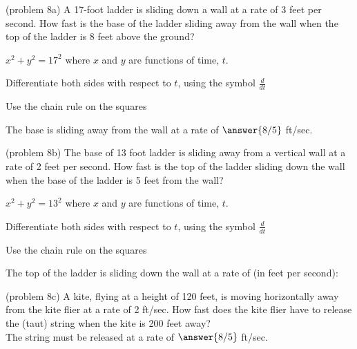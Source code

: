\documentclass[handout]{ximera}
\begin{document}
\begin{problem}(problem 8a)
A 17-foot ladder is sliding down a wall at a rate of 3 feet per second.  How fast is the base of the 
ladder sliding away from the wall when the top of the ladder is 8 feet above the ground?\\

\begin{hint}
$x^2 + y^2 = 17^2$ where  $x$ and $y$ are functions of time, $t$.
\end{hint}

\begin{hint}
Differentiate both sides with respect to $t$, using the symbol $\frac{d}{dt}$
\end{hint}
\begin{hint}
Use the chain rule on the squares
\end{hint}

The base is sliding away from the wall at a rate of $\answer{8/5}$ ft/sec.
\end{problem}

\begin{problem}(problem 8b)
The base of 13 foot ladder is sliding away from a vertical wall at a rate of 2 
feet per second.  How fast is the top of the ladder sliding down the wall when the base of the 
ladder is 5 feet from the wall?
\begin{hint}
$x^2 + y^2 = 13^2$ where  $x$ and $y$ are functions of time, $t$.
\end{hint}

\begin{hint}
Differentiate both sides with respect to $t$, using the symbol $\frac{d}{dt}$
\end{hint}
\begin{hint}
Use the chain rule on the squares
\end{hint}

The top of the ladder is sliding down the wall at a rate of (in feet per second):
\begin{multipleChoice}
\end{multipleChoice}
\end{problem}


\begin{problem}(problem 8c)
A kite, flying at a height of 120 feet, is moving horizontally away from the kite flier at a rate of 2 ft/sec.  
How fast does the kite flier have to release the (taut) string when the kite is 200 feet away?\\

The string must be released at a rate of $\answer{8/5}$ ft/sec.
\end{problem}
\end{document}
